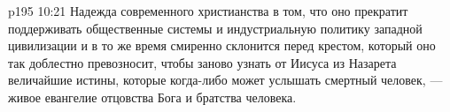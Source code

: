 \vs p195 10:21 Надежда современного христианства в том, что оно прекратит поддерживать общественные системы и индустриальную политику западной цивилизации и в то же время смиренно склонится перед крестом, который оно так доблестно превозносит, чтобы заново узнать от Иисуса из Назарета величайшие истины, которые когда\hyp{}либо может услышать смертный человек, --- живое евангелие отцовства Бога и братства человека.
